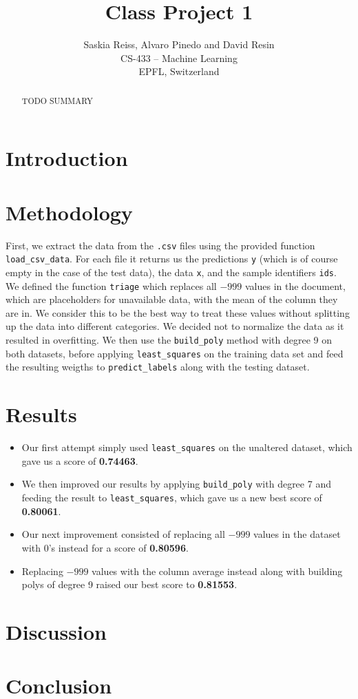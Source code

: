 \documentclass[10pt,conference,compsocconf]{IEEEtran}
\begin{document}
\title{Class Project 1}

\author{%
  Saskia Reiss, Alvaro Pinedo and David Resin\\%
  CS-433 -- Machine Learning\\EPFL, Switzerland%
}

\maketitle

\begin{abstract}
TODO SUMMARY
\end{abstract}

\section{Introduction}
\section{Methodology}
First, we extract the data from the \texttt{.csv} files using the provided function \texttt{load\_csv\_data}. For each file it returns us the predictions \texttt{y} (which is of course empty in the case of the test data), the data \texttt{x}, and the sample identifiers \texttt{ids}. We defined the function \texttt{triage} which replaces all $-999$ values in the document, which are placeholders for unavailable data, with the mean of the column they are in. We consider this to be the best way to treat these values without splitting up the data into different categories. We decided not to normalize the data as it resulted in overfitting. We then use the \texttt{build\_poly} method with degree 9 on both datasets, before applying \texttt{least\_squares} on the training data set and feed the resulting weigths to \texttt{predict\_labels} along with the testing dataset.
\section{Results}
\begin{itemize}
\item Our first attempt simply used \texttt{least\_squares} on the unaltered dataset, which gave us a score of \textbf{0.74463}.
\item We then improved our results by applying \texttt{build\_poly} with degree 7 and feeding the result to \texttt{least\_squares}, which gave us a new best score of \textbf{0.80061}.
\item Our next improvement  consisted of replacing all $-999$ values in the dataset with 0's instead for a score of \textbf{0.80596}.
\item Replacing $-999$ values with the column average instead along with building polys of degree 9 raised our best score to \textbf{0.81553}.
\end{itemize}
\section{Discussion}
\section{Conclusion}
\end{document}
